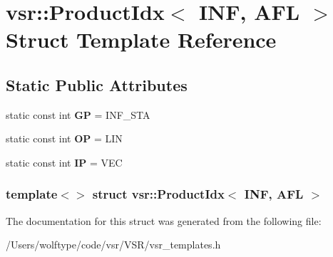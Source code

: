 \hypertarget{structvsr_1_1_product_idx_3_01_i_n_f_00_01_a_f_l_01_4}{\section{vsr\-:\-:Product\-Idx$<$ I\-N\-F, A\-F\-L $>$ Struct Template Reference}
\label{structvsr_1_1_product_idx_3_01_i_n_f_00_01_a_f_l_01_4}
}
\subsection*{Static Public Attributes}
\begin{DoxyCompactItemize}
\item 
\hypertarget{structvsr_1_1_product_idx_3_01_i_n_f_00_01_a_f_l_01_4_ad4bd73fec1316a728092db0456e21697}{static const int {\bfseries G\-P} = I\-N\-F\-\_\-\-S\-T\-A}\label{structvsr_1_1_product_idx_3_01_i_n_f_00_01_a_f_l_01_4_ad4bd73fec1316a728092db0456e21697}

\item 
\hypertarget{structvsr_1_1_product_idx_3_01_i_n_f_00_01_a_f_l_01_4_ade5f5aea231fc00d14d9141d9a71d376}{static const int {\bfseries O\-P} = L\-I\-N}\label{structvsr_1_1_product_idx_3_01_i_n_f_00_01_a_f_l_01_4_ade5f5aea231fc00d14d9141d9a71d376}

\item 
\hypertarget{structvsr_1_1_product_idx_3_01_i_n_f_00_01_a_f_l_01_4_a5ad3a691ab12e9fe18cc6e958c00c372}{static const int {\bfseries I\-P} = V\-E\-C}\label{structvsr_1_1_product_idx_3_01_i_n_f_00_01_a_f_l_01_4_a5ad3a691ab12e9fe18cc6e958c00c372}

\end{DoxyCompactItemize}
\subsubsection*{template$<$$>$ struct vsr\-::\-Product\-Idx$<$ I\-N\-F, A\-F\-L $>$}



The documentation for this struct was generated from the following file\-:\begin{DoxyCompactItemize}
\item 
/\-Users/wolftype/code/vsr/\-V\-S\-R/vsr\-\_\-templates.\-h\end{DoxyCompactItemize}
